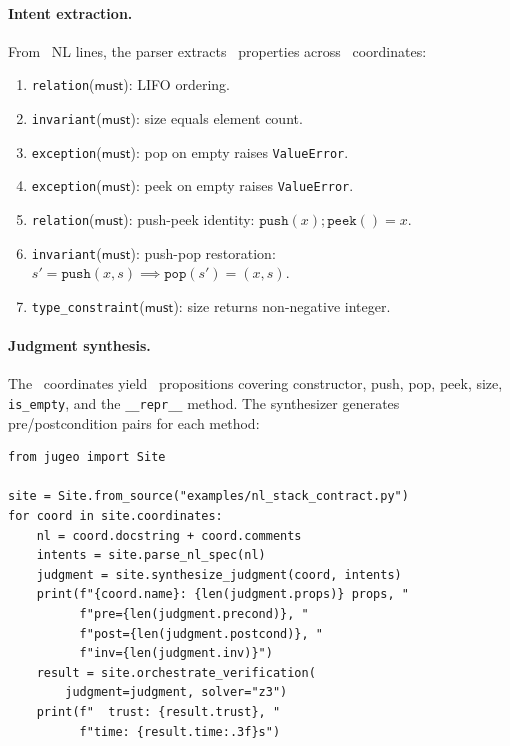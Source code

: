 \documentclass[11pt]{article}
\begin{document}
\paragraph{Intent extraction.}
From \ppLXXnlstackcontractNlLines\ NL lines, the parser extracts
\ppLXXnlstackcontractProps\ properties across
\ppLXXnlstackcontractCoords\ coordinates:
\begin{enumerate}[noitemsep]
  \item \texttt{relation}($\textsf{must}$): LIFO ordering.
  \item \texttt{invariant}($\textsf{must}$): size equals element count.
  \item \texttt{exception}($\textsf{must}$): pop on empty raises
        \texttt{ValueError}.
  \item \texttt{exception}($\textsf{must}$): peek on empty raises
        \texttt{ValueError}.
  \item \texttt{relation}($\textsf{must}$): push-peek identity:
        $\texttt{push}(x); \texttt{peek}() = x$.
  \item \texttt{invariant}($\textsf{must}$): push-pop restoration:
        $s' = \texttt{push}(x, s) \implies \texttt{pop}(s') =
        (x, s)$.
  \item \texttt{type\_constraint}($\textsf{must}$): size returns
        non-negative integer.
\end{enumerate}

\paragraph{Judgment synthesis.}
The \ppLXXnlstackcontractCoords\ coordinates yield
\ppLXXnlstackcontractProps\ propositions covering
constructor, push, pop, peek, size, \texttt{is\_empty},
and the \texttt{\_\_repr\_\_} method.  The synthesizer generates
pre/postcondition pairs for each method:

\begin{lstlisting}[style=jugeo-python]
from jugeo import Site

site = Site.from_source("examples/nl_stack_contract.py")
for coord in site.coordinates:
    nl = coord.docstring + coord.comments
    intents = site.parse_nl_spec(nl)
    judgment = site.synthesize_judgment(coord, intents)
    print(f"{coord.name}: {len(judgment.props)} props, "
          f"pre={len(judgment.precond)}, "
          f"post={len(judgment.postcond)}, "
          f"inv={len(judgment.inv)}")
    result = site.orchestrate_verification(
        judgment=judgment, solver="z3")
    print(f"  trust: {result.trust}, "
          f"time: {result.time:.3f}s")
\end{lstlisting}
\end{document}
